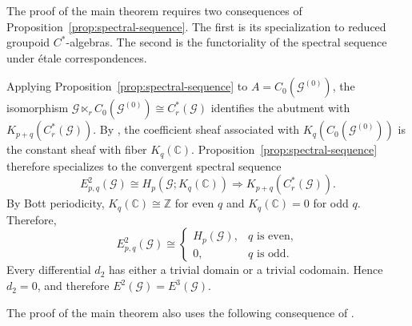 \documentclass[pdflatex,sn-mathphys-num]{sn-jnl}%
\theoremstyle{plain}
\theoremstyle{remark}
\theoremstyle{definition}
\numberwithin{equation}{section}
\begin{document}
The proof of the main theorem requires two consequences of Proposition~\ref{prop:spectral-sequence}. The first is its specialization to reduced groupoid \( C^* \)-algebras. The second is the functoriality of the spectral sequence under \'{e}tale correspondences.

Applying Proposition~\ref{prop:spectral-sequence} to \( A=C_0(\mathcal G^{(0)}) \), the isomorphism \( \mathcal G\ltimes_r C_0(\mathcal G^{(0)})\cong C_r^*(\mathcal G) \) identifies the abutment with \( K_{p+q}(C_r^*(\mathcal G)) \). By \cite[Proposition~3.1]{proietti2022homology}, the coefficient sheaf associated with \( K_q(C_0(\mathcal G^{(0)})) \) is the constant sheaf with fiber \( K_q(\mathbb C) \). Proposition~\ref{prop:spectral-sequence} therefore specializes to the convergent spectral sequence
\begin{equation}
\label{eq:groupoid-homology-spectral-sequence}
E^2_{p,q}(\mathcal G)
\cong
H_p(\mathcal G;K_q(\mathbb C))
\Longrightarrow
K_{p+q}(C_r^*(\mathcal G)).
\end{equation}
By Bott periodicity, \( K_q(\mathbb C)\cong\mathbb Z \) for even \( q \) and \( K_q(\mathbb C)=0 \) for odd \( q \). Therefore,
\begin{equation}
\label{eq:groupoid-homology-e2}
E^2_{p,q}(\mathcal G)
\cong
\begin{cases}
H_p(\mathcal G), & q \text{ is even},\\
0, & q \text{ is odd}.
\end{cases}
\end{equation}
Every differential \( d_2 \) has either a trivial domain or a trivial codomain. Hence \( d_2=0 \), and therefore \( E^2(\mathcal G)=E^3(\mathcal G) \).

The proof of the main theorem also uses the following consequence of \cite[Proposition~3.22, Remark~4.6, Theorem~5.14, Theorem~6.1]{miller2025isomorphisms}.
\end{document}
